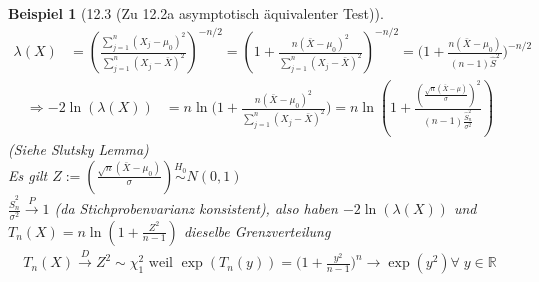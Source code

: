 \documentclass[a4paper,openany]{book}
\theoremstyle{mytheoremstyle}
\newtheorem*{bei}{Beispiel}
\theoremstyle{mytheoremstyle2}
\begin{document}
\begin{bei}[12.3 (Zu 12.2a asymptotisch äquivalenter Test)]
  \begin{align*}
    \lambda (X)
    &=\left(\frac{\sum_{j=1}^{n}{(X_j-\mu _0)^2}}{\sum_{j=1}^{n}{(X_j-\bar{X})^2}}\right)^{-n/2}
    =\left(1+\frac{n(\bar{X}-\mu _0)^2}{\sum_{j=1}^{n}{(X_j-\bar{X})^2}}\right)^{-n/2}=\bigg(1+\frac{n(\bar{X}-\mu _0)}{(n-1)\hat{S}^2}\bigg)^{-n/2}
  \end{align*}
  \begin{align*}
    \Rightarrow -2\ln(\lambda (X))
    &=n\ln \bigg(1+\frac{n(\bar{X}-\mu _0)^2}{\sum_{j=1}^{n}{(X_j-\bar{X})^2}}\bigg)
    =n \ln \left(1+\frac{\left(\frac{\sqrt{n}(\bar{X}-\mu )}{\sigma }\right)^2}{(n-1)\frac{\hat{S}_n^2}{\sigma ^2}}\right)
  \end{align*}
  (Siehe Slutsky Lemma) \\
  Es gilt $Z:=\left(\frac{\sqrt{n}(\bar{X}-\mu _0)}{\sigma }\right)\overset{H_0}\sim N(0,1)$ \\
  $\frac{\hat{S}_n^2}{\sigma ^2}\overset{P}\to 1$ (da Stichprobenvarianz konsistent), also haben $-2\ln(\lambda (X))$ und $T_n(X)=n\ln \left(1+\frac{Z^2}{n-1}\right)$ dieselbe Grenzverteilung  
  \begin{align*}
    T_n(X)\overset{D}\longrightarrow Z^2\sim \chi _{1}^2 \text{ weil }\exp(T_n(y))=\bigg(1+\frac{y^2}{n-1}\bigg)^n \longrightarrow \exp(y^2)\forall\;y \in \mathbb{R}
  \end{align*}
\end{bei}
\end{document}
